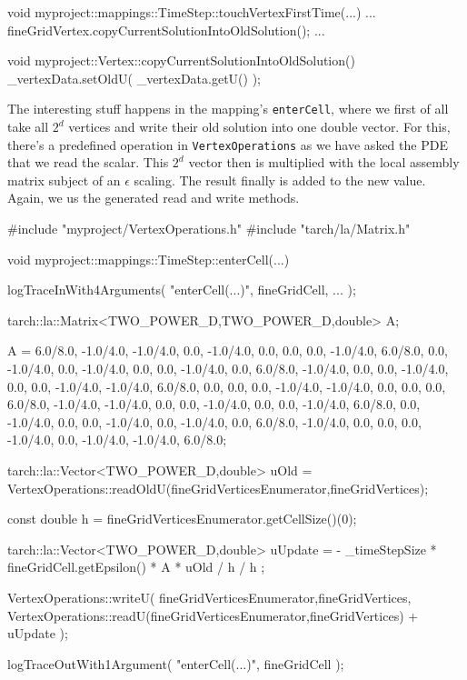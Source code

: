 \begin{code}
void myproject::mappings::TimeStep::touchVertexFirstTime(...) {
 ...  
 fineGridVertex.copyCurrentSolutionIntoOldSolution();
 ...  
}

void myproject::Vertex::copyCurrentSolutionIntoOldSolution() {
  _vertexData.setOldU( _vertexData.getU() );
}
\end{code}

\noindent
The interesting stuff happens in the mapping's \texttt{enterCell}, 
where we first of all take all $2^d$ vertices and write their old solution into
one double vector. 
For this, there's a predefined operation in \texttt{VertexOperations} as we have
asked the PDE that we read the scalar.
This $2^d$ vector then is multiplied with the local assembly matrix subject of
an $\epsilon$ scaling.
The result finally is added to the new value.
Again, we us the generated read and write methods.

\begin{code}
#include "myproject/VertexOperations.h"
#include "tarch/la/Matrix.h"

void myproject::mappings::TimeStep::enterCell(...) {
  logTraceInWith4Arguments( "enterCell(...)", fineGridCell, ... );

  tarch::la::Matrix<TWO_POWER_D,TWO_POWER_D,double> A;

  A =  6.0/8.0, -1.0/4.0, -1.0/4.0,      0.0, -1.0/4.0,      0.0,      0.0,      0.0,
      -1.0/4.0,  6.0/8.0,      0.0, -1.0/4.0,      0.0, -1.0/4.0,      0.0,      0.0,
      -1.0/4.0,      0.0,  6.0/8.0, -1.0/4.0,      0.0,      0.0, -1.0/4.0,      0.0,
           0.0, -1.0/4.0, -1.0/4.0,  6.0/8.0,      0.0,      0.0,      0.0, -1.0/4.0,
      -1.0/4.0,      0.0,      0.0,      0.0,  6.0/8.0, -1.0/4.0, -1.0/4.0,      0.0,
           0.0, -1.0/4.0,      0.0,      0.0, -1.0/4.0,  6.0/8.0,      0.0, -1.0/4.0,
           0.0,      0.0, -1.0/4.0,      0.0, -1.0/4.0,      0.0,  6.0/8.0, -1.0/4.0,
           0.0,      0.0,      0.0, -1.0/4.0,      0.0, -1.0/4.0, -1.0/4.0,  6.0/8.0;

  tarch::la::Vector<TWO_POWER_D,double> uOld = 
    VertexOperations::readOldU(fineGridVerticesEnumerator,fineGridVertices);

  const double h = fineGridVerticesEnumerator.getCellSize()(0);

  tarch::la::Vector<TWO_POWER_D,double> uUpdate = 
    - _timeStepSize * fineGridCell.getEpsilon() * A * uOld / h / h  ;

  VertexOperations::writeU(
    fineGridVerticesEnumerator,fineGridVertices,
    VertexOperations::readU(fineGridVerticesEnumerator,fineGridVertices) + uUpdate
  );

  logTraceOutWith1Argument( "enterCell(...)", fineGridCell );
}
\end{code}

